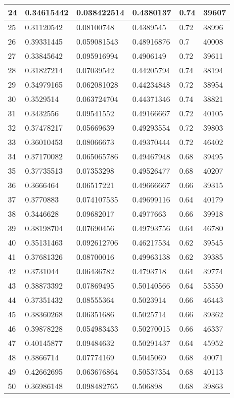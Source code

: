 \begin{longtable}{|l|l|l|l|l|l|}
24 & 0.34615442 & 0.038422514 & 0.4380137 & 0.74 & 39607 \\ \hline 
25 & 0.31120542 & 0.08100748 & 0.4389545 & 0.72 & 38996 \\ \hline 
26 & 0.39331445 & 0.059081543 & 0.48916876 & 0.7 & 40008 \\ \hline 
27 & 0.33845642 & 0.095916994 & 0.4906149 & 0.72 & 39611 \\ \hline 
28 & 0.31827214 & 0.07039542 & 0.44205794 & 0.74 & 38194 \\ \hline 
29 & 0.34979165 & 0.062081028 & 0.44234848 & 0.72 & 38954 \\ \hline 
30 & 0.3529514 & 0.063724704 & 0.44371346 & 0.74 & 38821 \\ \hline 
31 & 0.3432556 & 0.09541552 & 0.49166667 & 0.72 & 40105 \\ \hline 
32 & 0.37478217 & 0.05669639 & 0.49293554 & 0.72 & 39803 \\ \hline 
33 & 0.36010453 & 0.08066673 & 0.49370444 & 0.72 & 46402 \\ \hline 
34 & 0.37170082 & 0.065065786 & 0.49467948 & 0.68 & 39495 \\ \hline 
35 & 0.37735513 & 0.07353298 & 0.49526477 & 0.68 & 40207 \\ \hline 
36 & 0.3666464 & 0.06517221 & 0.49666667 & 0.66 & 39315 \\ \hline 
37 & 0.3770883 & 0.074107535 & 0.49699116 & 0.64 & 40179 \\ \hline 
38 & 0.3446628 & 0.09682017 & 0.4977663 & 0.66 & 39918 \\ \hline 
39 & 0.38198704 & 0.07690456 & 0.49793756 & 0.64 & 46780 \\ \hline 
40 & 0.35131463 & 0.092612706 & 0.46217534 & 0.62 & 39545 \\ \hline 
41 & 0.37681326 & 0.08700016 & 0.49963138 & 0.62 & 39385 \\ \hline 
42 & 0.3731044 & 0.06436782 & 0.4793718 & 0.64 & 39774 \\ \hline 
43 & 0.38873392 & 0.07869495 & 0.50140566 & 0.64 & 53550 \\ \hline 
44 & 0.37351432 & 0.08555364 & 0.5023914 & 0.66 & 46443 \\ \hline 
45 & 0.38360268 & 0.06351686 & 0.5025714 & 0.66 & 39362 \\ \hline 
46 & 0.39878228 & 0.054983433 & 0.50270015 & 0.66 & 46337 \\ \hline 
47 & 0.40145877 & 0.09484632 & 0.50291437 & 0.64 & 45952 \\ \hline 
48 & 0.3866714 & 0.07774169 & 0.5045069 & 0.68 & 40071 \\ \hline 
49 & 0.42662695 & 0.063676864 & 0.50537354 & 0.68 & 40113 \\ \hline 
50 & 0.36986148 & 0.098482765 & 0.506898 & 0.68 & 39863 \\ \hline 
\end{longtable}